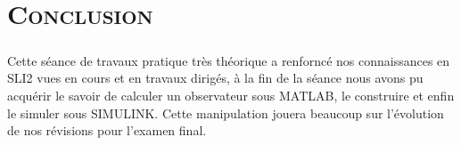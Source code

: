 \chapter*{\textsc {Conclusion}}
	
	\paragraph{}
	Cette séance de travaux pratique très théorique a renforncé nos connaissances en SLI2 vues en cours et en travaux dirigés, à la fin de la séance nous avons pu acquérir le savoir de calculer un observateur sous MATLAB, le construire et enfin le simuler sous SIMULINK. Cette manipulation jouera beaucoup sur l'évolution de nos révisions pour l'examen final.   